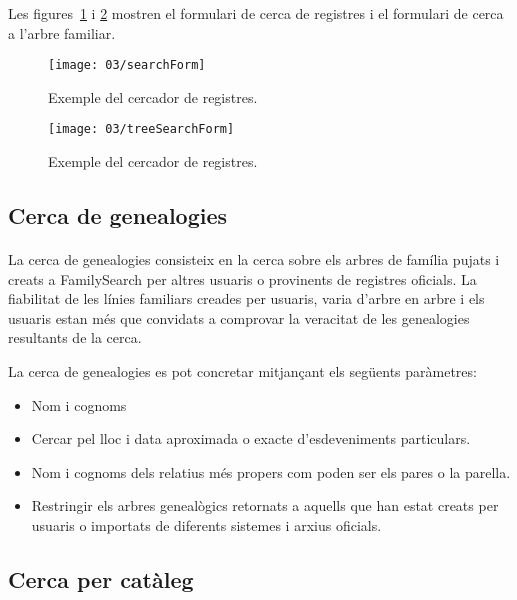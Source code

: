         Les figures~\ref{fig:fsSearcher} i \ref{fig:treeSearcher} mostren el formulari de cerca de registres i el formulari de cerca a l'arbre familiar.

        \begin{figure}[h]
            \texttt{[image: 03/searchForm]}
            \centering
            \caption{Exemple del cercador de registres.\label{fig:fsSearcher}}
        \end{figure}

        \begin{figure}[h]
            \texttt{[image: 03/treeSearchForm]}
            \centering
            \caption{Exemple del cercador de registres.\label{fig:treeSearcher}}
        \end{figure}


    \subsection{Cerca de genealogies}

        \paragraph{}
        La cerca de genealogies consisteix en la cerca sobre els arbres de família pujats i creats a FamilySearch per altres usuaris o provinents de registres oficials. La fiabilitat de les línies familiars creades per usuaris, varia d’arbre en arbre i els usuaris estan més que convidats a comprovar la veracitat de les genealogies resultants de la cerca.

        La cerca de genealogies es pot concretar mitjançant els següents paràmetres:

        \begin{itemize}
            \item Nom i cognoms
            \item Cercar pel lloc i data aproximada o exacte d’esdeveniments particulars.
            \item Nom i cognoms dels relatius més propers com poden ser els pares o la parella.
            \item Restringir els arbres genealògics retornats a aquells que han estat creats per usuaris o importats de diferents sistemes i arxius oficials.
        \end{itemize}


    \subsection{Cerca per catàleg}

